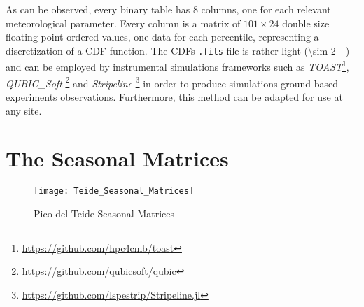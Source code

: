 As can be observed, every binary table has \num{8} columns, one for each
relevant meteorological parameter. Every column is a matrix of $101 \times
24$ double size floating point ordered values, one data for each
percentile, representing a discretization of a CDF function.  The CDFs
\texttt{.fits} file is rather light (\SI{\sim 2}{\mega\byte}) and can be
employed by instrumental simulations frameworks such as
\emph{TOAST}\footnote{\url{https://github.com/hpc4cmb/toast}},
\emph{QUBIC\_Soft} \footnote{\url{https://github.com/qubicsoft/qubic}} and
\emph{Stripeline}
\footnote{\url{https://github.com/lspestrip/Stripeline.jl}} in order to
produce simulations ground-based experiments observations. Furthermore,
this method can be adapted for use at any site.

\section{The Seasonal Matrices}

\begin{figure}
        \centering
        \texttt{[image: Teide\_Seasonal\_Matrices]}
        \caption{Pico del Teide Seasonal Matrices}
        \label{fig:teide_seasonal_matrices}
\end{figure}

